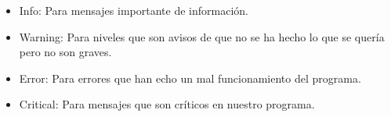 \begin{itemize}
\item Info: Para mensajes importante de información.
\item Warning: Para niveles que son avisos de que no se ha hecho lo que se quería pero no son graves.
\item Error: Para errores que han echo un mal funcionamiento del programa.
\item Critical: Para mensajes que son críticos en nuestro programa.


\end{itemize}
